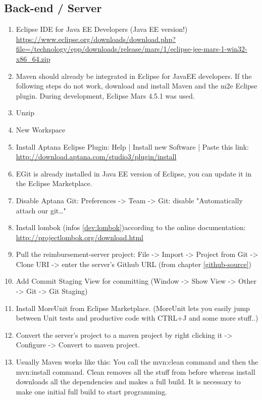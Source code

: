 \subsection{Back-end / Server}
\begin{enumerate}
	\item Eclipse IDE for Java EE Developers (Java EE version!) \newline
	\url{https://www.eclipse.org/downloads/download.php?file=/technology/epp/downloads/release/mars/1/eclipse-jee-mars-1-win32-x86_64.zip}
	\item Maven should already be integrated in Eclipse for JavaEE developers. If the following steps do not work, download and install Maven and the m2e Eclipse plugin. During development, Eclipse Mars 4.5.1 was used.
	\item Unzip
	\item New Workspace
	\item Install Aptana Eclipse Plugin: Help | Install new Software | Paste this link:
	\newline \url{http://download.aptana.com/studio3/plugin/install}
	\item EGit is already installed in Java EE version of Eclipse, you can update it in the Eclipse Marketplace.
	\item Disable Aptana Git: Preferences -> Team -> Git: disable "Automatically attach our git…"
	\item Install lombok (infos \ref{dev:lombok})according to the online documentation:\newline
	\url{http://projectlombok.org/download.html}
	\item Pull the reimbursement-server project: File -> Import -> Project from Git -> Clone URI -> enter the server's Github URL (from chapter \ref{github-source})
	\item Add Commit Staging View for committing (Window -> Show View -> Other -> Git -> Git Staging)
	\item Install MoreUnit from Eclipse Marketplace. (MoreUnit lets you easily jump between Unit tests and productive code with CTRL+J and some more stuff..)
	\item  Convert the server's project to a maven project by right clicking it -> Configure -> Convert to maven project.
	\item Usually Maven works like this: You call the mvn:clean command and then the mvn:install command. Clean removes all the stuff from before whereas install downloads all the dependencies and makes a full build. It is necessary to make one initial full build to start programming.

\end{enumerate}
